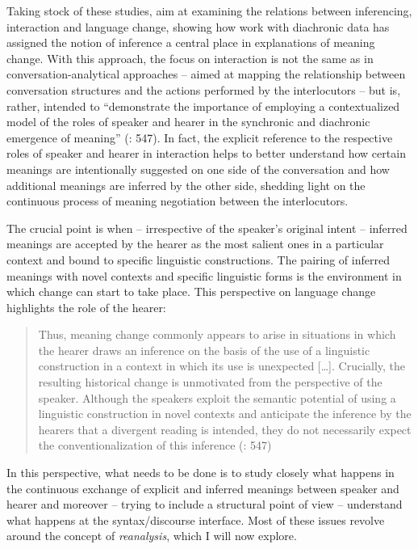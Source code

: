 Taking stock of these studies, \citet{EhmerRosemeyer2018} aim at examining the relations between inferencing, interaction and language change, showing how work with diachronic data has assigned the notion of inference a central place in explanations of meaning change. With this approach, the focus on interaction is not the same as in conversation-analytical approaches – aimed at mapping the relationship between conversation structures and the actions performed by the interlocutors – but is, rather, intended to “demonstrate the importance of employing a contextualized model of the roles of speaker and hearer in the synchronic and diachronic emergence of meaning” (\citealt{EhmerRosemeyer2018}: 547). In fact, the explicit reference to the respective roles of speaker and hearer in interaction helps to better understand how certain meanings are intentionally suggested on one side of the conversation and how additional meanings are inferred by the other side, shedding light on the continuous process of meaning negotiation between the interlocutors.

The crucial point is when – irrespective of the speaker’s original intent – inferred meanings are accepted by the hearer as the most salient ones in a particular context and bound to specific linguistic constructions. The pairing of inferred meanings with novel contexts and specific linguistic forms is the environment in which change can start to take place. This perspective on language change highlights the role of the hearer:

\begin{quote}
Thus, meaning change commonly appears to arise in situations in which the hearer draws an inference on the basis of the use of a linguistic construction in a context in which its use is unexpected […]. Crucially, the resulting historical change is unmotivated from the perspective of the speaker. Although the speakers exploit the semantic potential of using a linguistic construction in novel contexts and anticipate the inference by the hearers that a divergent reading is intended, they do not necessarily expect the conventionalization of this inference (\citealt{EhmerRosemeyer2018}: 547)
\end{quote}

In this perspective, what needs to be done is to study closely what happens in the continuous exchange of explicit and inferred meanings between speaker and hearer and moreover – trying to include a structural point of view – understand what happens at the syntax/discourse interface. Most of these issues revolve around the concept of \textit{reanalysis}, which I will now explore.

